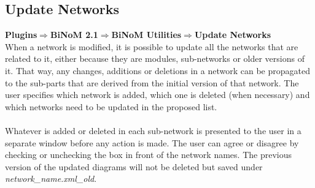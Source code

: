 \subsection{Update Networks}
\textbf{Plugins$\Rightarrow$BiNoM 2.1$\Rightarrow$BiNoM Utilities$\Rightarrow$Update Networks}\\
When a network is modified, it is possible to update all the networks that are related to it, either because they are modules, sub-networks or older versions of it. That way, any changes, additions or deletions in a network can be propagated to the sub-parts that are derived from the initial version of that network. The user specifies which network is added, which one is deleted (when necessary) and which networks need to be updated in the proposed list.\\\\
Whatever is added or deleted in each sub-network is presented to the user in a separate window before any action is made. The user can agree or disagree by checking or unchecking the box in front of the network names. The previous version of the updated diagrams will not be deleted but saved under \textit{network\_name.xml\_old}. 

